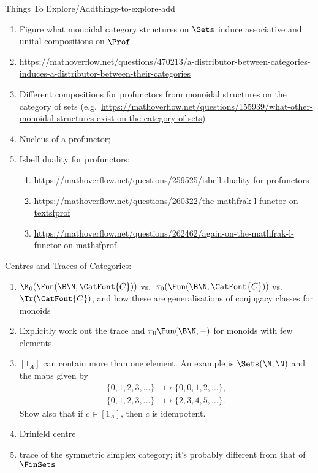 \begin{remark}{Things To Explore/Add}{things-to-explore-add}
\begin{enumerate}
            Is $\Delta_{\emptyset}$ a unit?
        \item Figure what monoidal category structures on $\Sets$ induce associative and unital compositions on $\Prof$.
        \item \url{https://mathoverflow.net/questions/470213/a-distributor-between-categories-induces-a-distributor-between-their-categories}
        \item Different compositions for profunctors from monoidal structures on the category of sets (e.g.\ \url{https://mathoverflow.net/questions/155939/what-other-monoidal-structures-exist-on-the-category-of-sets})
        \item Nucleus of a profunctor;
        \item Isbell duality for profunctors:
            \begin{enumerate}
                \item \url{https://mathoverflow.net/questions/259525/isbell-duality-for-profunctors}
                \item \url{https://mathoverflow.net/questions/260322/the-mathfrak-l-functor-on-textsfprof}
                \item \url{https://mathoverflow.net/questions/262462/again-on-the-mathfrak-l-functor-on-mathsfprof}
            \end{enumerate}
    \end{enumerate}
    Centres and Traces of Categories:
    \begin{enumerate}
        \item $\K_{0}(\Fun(\B\N,\CatFont{C}))$ vs.\ $\pi_{0}(\Fun(\B\N,\CatFont{C}))$ vs.\ $\Tr(\CatFont{C})$, and how these are generalisations of conjugacy classes for monoids
        \item Explicitly work out the trace and $\pi_{0}\Fun(\B\N,-)$ for monoids with few elements.
        \item $[1_{A}]$ can contain more than one element. An example is $\Sets(\N,\N)$ and the maps given by
            \begin{align*}
                \{0,1,2,3,\ldots\} &\mapsto \{0,0,1,2,\ldots\},\\
                \{0,1,2,3,\ldots\} &\mapsto \{2,3,4,5,\ldots\}.
            \end{align*}
            Show also that if $c\in[1_{A}]$, then $c$ is idempotent.
        \item Drinfeld centre
        \item trace of the symmetric simplex category; it's probably different from that of $\FinSets$

\end{enumerate}
\end{remark}
